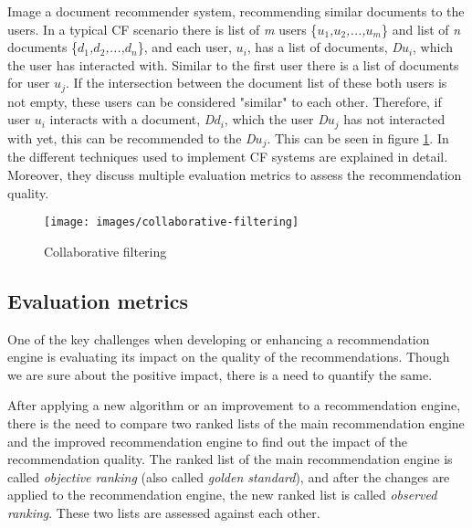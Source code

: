 Image a document recommender system, recommending similar documents to the users. In a typical CF scenario there is list of \emph{m} users \{\emph{$u_{1}$,$u_{2}$,...,$u_{m}$}\} and list of \emph{n} documents \{\emph{$d_{1}$,$d_{2}$,...,$d_{n}$}\}, and each user, \emph{$u_{i}$}, has a list of documents, \emph{D$u_{i}$}, which the user has interacted with. Similar to the first user there is a list of documents for user \emph{$u_{j}$}. If the intersection between the document list of these both users is not empty, these users can be considered "similar" to each other. Therefore, if user \emph{$u_{i}$} interacts with a document, \emph{D$d_{i}$}, which the user \emph{D$u_{j}$} has not interacted with yet, this can be recommended to the \emph{D$u_{j}$}. This can be seen in figure \ref{fig:collaborative-filtering}.
In \cite{su2009survey} the different techniques used to implement CF systems are explained in detail. Moreover, they discuss multiple evaluation metrics to assess the recommendation quality.


\begin{figure}[!h]
	\centering
	\texttt{[image: images/collaborative-filtering]}
	\caption{Collaborative filtering}
	\label{fig:collaborative-filtering}
\end{figure}



\subsection{Evaluation metrics}
\label{subsec:evaluation-metrics}
One of the key challenges when developing or enhancing a recommendation engine is evaluating its impact on the quality of the recommendations. Though we are sure about the positive impact, there is a need to quantify the same.

After applying a new algorithm or an improvement to a recommendation engine, there is the need to compare two ranked lists of the main recommendation engine and the improved recommendation engine to find out the impact of the recommendation quality. The ranked list of the main recommendation engine is called \emph{objective ranking} (also called \emph{golden standard}), and after the changes are applied to the recommendation engine, the new ranked list is called \emph{observed ranking}. These two lists are assessed against each other.


